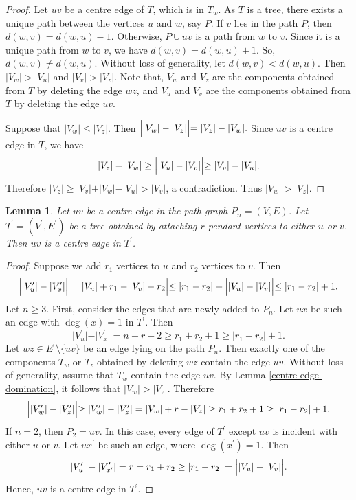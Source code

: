 \documentclass[12pt]{article}
\newtheorem{lemma}{Lemma}[section]
\begin{document}
\begin{proof}
  Let $uv$ be a centre edge of $T$, which is in $T_w$. As $T$ is a tree, there exists a unique path between the vertices $u$ and $w$, say $P$. If $v$ lies in the path $P$, then $d(w,v)=d(w,u)-1$. Otherwise, $P \cup uv$ is a path from $w$ to $v$. Since it is a unique path from $w$ to $v$, we have   $d(w,v)=d(w,u)+1$. So, $d(w,v) \neq d(w,u)$.
    Without loss of generality, let $d(w,v) < d(w,u)$. Then $\vert V_w \vert > \vert V_u \vert$ and $\vert V_v \vert > \vert V_z \vert.$ Note that, $V_w$ and $V_z$ are the components obtained from $T$ by deleting the edge $wz$, and $V_u$ and $V_v$ are the components obtained from $T$ by deleting the edge $uv$.
    
    Suppose that $\vert V_w \vert  \leq \vert V_z \vert$. Then $\Bigl| \vert V_w \vert - \vert V_z\vert \Bigl|=\vert V_z \vert - \vert V_w \vert.$ Since $uv$ is a centre edge in $T$, we have 
    $$
\vert V_z \vert - \vert V_w \vert \geq \Bigl| \vert V_u \vert - \vert V_v\vert \Bigl|\geq \vert V_v \vert - \vert V_u\vert.
    $$
Therefore $\vert V_z \vert \geq \vert V_v \vert + \vert V_w \vert - \vert V_u\vert>\vert V_v \vert$, a contradiction. Thus $\vert V_w \vert  > \vert V_z \vert$. 
    \end{proof}
    \begin{lemma}\label{centre edge unchanged}
 Let $uv$ be a centre edge in the path graph $P_n = (V, E)$. Let $T^\prime =(V^\prime,E^\prime)$ be a tree obtained by attaching  $r$ pendant vertices to either $u$ or $v$. Then $uv$ is a centre edge in $T^\prime$. 
    \end{lemma}
    \begin{proof}
Suppose we add $r_1$ vertices to $u$ and $r_2$ vertices to $v$.
Then 
$$
\Bigl| \vert V^\prime_u \vert - \vert V^\prime_v\vert \Bigl|=\Bigl| \vert V_u \vert+r_1 - \vert V_v\vert-r_2 \Bigl|\leq \vert r_1-r_2\vert+\Bigl| \vert V_u \vert - \vert V_v\vert \Bigl| \leq \vert r_1-r_2\vert+1.
$$
Let $n \geq 3$.
First, consider the edges that are newly added to $P_n$. Let $ux$ be such an edge with $\deg(x)=1$ in $T^\prime.$ Then 
$$
\vert V^\prime _u \vert -\vert V^\prime_x\vert=n+r-2\geq r_1+r_2+1 \geq \vert r_1-r_2\vert+1.
$$
Let $wz \in E^\prime \setminus \{uv\}$ be an edge lying on the path $P_n$. Then exactly one of the components $T_w$ or $T_z$ obtained by deleting $wz$ contain the edge $uv$. Without loss of generality, assume that $T_w$ contain the edge $uv$. By Lemma \ref{centre-edge-domination}, it follows that $\vert V_w\vert > \vert V_z \vert$.
Therefore
$$
\Bigl| \vert V^\prime_w \vert - \vert V^\prime_z\vert \Bigl| \geq \vert V^\prime_w \vert - \vert V^\prime_z\vert= \vert V_w \vert +r -\vert V_z \vert\geq r_1+r_2+1 \geq \vert r_1-r_2\vert+1.
$$
If $n=2$, then $P_2=uv$. In this case, every edge of $T^{'}$ except $uv$ is incident with either $u$ or $v$. Let $ux^\prime$ be such an edge, where $\deg(x^\prime)=1$. Then
$$
\vert V^\prime _u \vert -\vert V^\prime_{x ^\prime}\vert=r=r_1+r_2 \geq \vert r_1-r_2\vert=\Bigl| \vert V_u \vert - \vert V_v\vert \Bigl|.
$$
Hence,  $uv$ is a centre edge in $T^\prime$.

    \end{proof}
\end{document}
